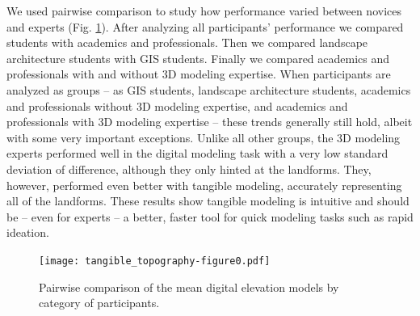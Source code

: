 \documentclass[Afour,sagev,times]{sagej} %
\begin{document}
We used pairwise comparison to study 
how performance varied between 
novices and experts (Fig. \ref{fig:comparison}).
After analyzing all participants' performance
we compared students with academics and professionals. 
Then we compared landscape architecture students with GIS students.
Finally we compared academics and professionals 
with and without 3D modeling expertise.
%
When participants are analyzed as groups 
-- as GIS students, landscape architecture students, 
academics and professionals without 3D modeling expertise, 
and academics and professionals with 3D modeling expertise -- 
these trends generally still hold, 
albeit with some very important exceptions.
%
Unlike all other groups, 
the 3D modeling experts performed well 
in the digital modeling task
with a very low standard deviation of difference, 
although they only hinted at the landforms. 
They, however, performed even better with tangible modeling,
accurately representing all of the landforms. 
%
%
These results show 
tangible modeling is intuitive 
and should be -- even for experts -- 
a better, faster tool 
for quick modeling tasks such as rapid ideation.


%

\begin{figure}[t]
\texttt{[image: tangible\_topography-figure0.pdf]}
\caption{Pairwise comparison of the mean digital elevation models 
by category of participants.}
\label{fig:comparison}
\end{figure}



\end{document}
